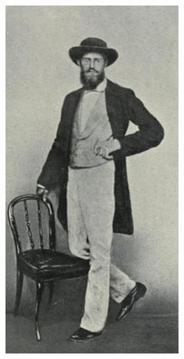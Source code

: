 \documentclass[10pt]{beamer}
\begin{document}
\begin{frame}
	\begin{columns}
		\begin{column}{0.5\textwidth}
			\begin{center}
				\includegraphics[width=0.5\textwidth]{figures/wallace1.jpg}
			\end{center}
		\end{column}
		

\end{columns}
\end{frame}
\end{document}
